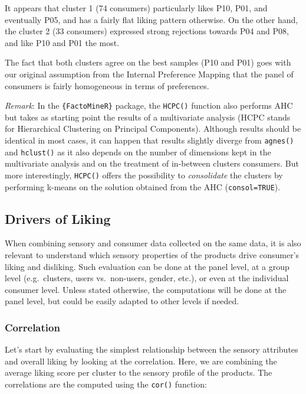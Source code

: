 \documentclass[
]{book}
\begin{document}
It appears that cluster 1 (74 consumers) particularly likes P10, P01, and eventually P05, and has a fairly flat liking pattern otherwise. On the other hand, the cluster 2 (33 consumers) expressed strong rejections towards P04 and P08, and like P10 and P01 the most.

The fact that both clusters agree on the best samples (P10 and P01) goes with our original assumption from the Internal Preference Mapping that the panel of consumers is fairly homogeneous in terms of preferences.

\emph{Remark}: In the \texttt{\{FactoMineR\}} package, the \texttt{HCPC()} function also performs AHC but takes as starting point the results of a multivariate analysis (HCPC stands for Hierarchical Clustering on Principal Components). Although results should be identical in most cases, it can happen that results slightly diverge from \texttt{agnes()} and \texttt{hclust()} as it also depends on the number of dimensions kept in the multivariate analysis and on the treatment of in-between clusters consumers. But more interestingly, \texttt{HCPC()} offers the possibility to \emph{consolidate} the clusters by performing k-means on the solution obtained from the AHC (\texttt{consol=TRUE}).

\hypertarget{drivers-of-liking}{%
\subsection{Drivers of Liking}\label{drivers-of-liking}}

When combining sensory and consumer data collected on the same data, it is also relevant to understand which sensory properties of the products drive consumer's liking and disliking. Such evaluation can be done at the panel level, at a group level (e.g.~clusters, users vs.~non-users, gender, etc.), or even at the individual consumer level. Unless stated otherwise, the computations will be done at the panel level, but could be easily adapted to other levels if needed.

\hypertarget{correlation}{%
\subsubsection{Correlation}\label{correlation}}

Let's start by evaluating the simplest relationship between the sensory attributes and overall liking by looking at the correlation. Here, we are combining the average liking score per cluster to the sensory profile of the products. The correlations are the computed using the \texttt{cor()} function:
\end{document}

